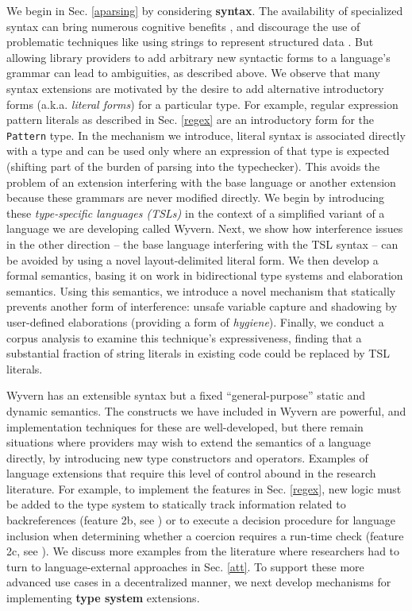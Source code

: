 We begin in Sec. \ref{aparsing} by considering \textbf{syntax}. The availability of specialized syntax can bring numerous cognitive benefits \cite{green1996usability}, and discourage the use of problematic techniques like using strings to represent structured data \cite{Bravenboer:2007:PIA:1289971.1289975}. But allowing library providers to add arbitrary new syntactic forms to a language's grammar can lead to ambiguities, as described above. We observe that many syntax extensions are motivated by the desire to add alternative  introductory forms (a.k.a. \emph{literal forms}) for a particular type. For example, regular expression pattern literals as described in Sec. \ref{regex} are an introductory form for the \verb|Pattern| type.  In the mechanism we introduce, literal syntax is associated directly with a type and can be used only where an expression of that type is expected (shifting part of the burden of parsing into the typechecker). This avoids the problem of an extension interfering with the base language or another extension  because these grammars are never modified directly. We begin by introducing these \emph{type-specific languages (TSLs)} in the context of a simplified variant of a language we are developing called Wyvern. Next, we show how interference issues in the other direction -- the base language interfering with  the TSL syntax -- can be avoided by using a novel layout-delimited literal form. We then develop a formal semantics, basing it on work in bidirectional type systems and elaboration semantics. Using this semantics, we introduce a novel mechanism that statically prevents another form of interference: unsafe variable capture and shadowing by user-defined elaborations (providing a form of \emph{hygiene}). Finally, we conduct a corpus analysis to examine this technique's expressiveness, finding that a substantial fraction of string literals in existing code could be replaced by TSL literals.

Wyvern has an extensible syntax but a fixed ``general-purpose'' static and dynamic semantics. The  constructs we have included in Wyvern are powerful, and implementation techniques for these are well-developed, but there remain situations where providers may wish to extend the {semantics} of a language directly, by introducing new type constructors and operators. Examples of language extensions that require this level of control abound in the research literature. For example, to implement the features in Sec. \ref{regex}, new logic must be added to the type system to statically track information related to backreferences (feature 2b, see \cite{spishak2012type}) or to execute a decision procedure for language inclusion when determining whether a coercion requires a run-time check (feature 2c, see \cite{fulton-thesis,HosoyaVouillonPierce2000ICFP}). We discuss more examples from the literature where researchers had to turn to language-external approaches in Sec. \ref{att}. To support these more advanced use cases in a decentralized manner, we next develop mechanisms for implementing \textbf{type system} extensions. 

